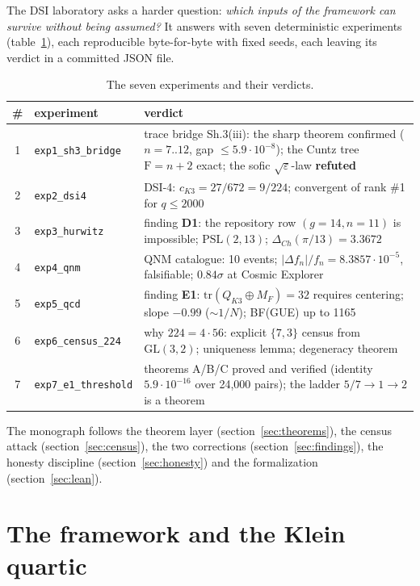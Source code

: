 \documentclass[11pt,a4paper]{article}
\theoremstyle{definition}
\newcommand{\F}{\mathrm{F}}
\begin{document}
The DSI laboratory asks a harder question: \emph{which inputs of the
framework can survive without being assumed?} It answers with seven
deterministic experiments (table~\ref{tab:experiments}), each
reproducible byte-for-byte with fixed seeds, each leaving its verdict
in a committed JSON file.

\begin{table}[ht]
\centering\small
\begin{tabular}{@{}clp{7.2cm}@{}}
\toprule
\# & experiment & verdict \\
\midrule
1 & \texttt{exp1\_sh3\_bridge} & trace bridge Sh.3(iii): the sharp theorem confirmed ($n=7..12$, gap $\le 5.9\cdot10^{-8}$); the Cuntz tree $\F = n+2$ exact; the sofic $\sqrt{\varepsilon}$-law \textbf{refuted} \\
2 & \texttt{exp2\_dsi4} & DSI-4: $c_{K3} = 27/672 = 9/224$; convergent of rank \#1 for $q \le 2000$ \\
3 & \texttt{exp3\_hurwitz} & finding \textbf{D1}: the repository row $(g{=}14, n{=}11)$ is impossible; $\mathrm{PSL}(2,13)$; $\Delta_{Ch}(\pi/13) = 3.3672$ \\
4 & \texttt{exp4\_qnm} & QNM catalogue: 10 events; $|\Delta f_n|/f_n = 8.3857\cdot 10^{-5}$, falsifiable; $0.84\sigma$ at Cosmic Explorer \\
5 & \texttt{exp5\_qcd} & finding \textbf{E1}: $\mathrm{tr}(Q_{K3}\oplus M_F) = 32$ requires centering; slope $-0.99$ ($\sim 1/N$); BF(GUE) up to 1165 \\
6 & \texttt{exp6\_census\_224} & why $224 = 4\cdot 56$: explicit $\{7,3\}$ census from $\mathrm{GL}(3,2)$; uniqueness lemma; degeneracy theorem \\
7 & \texttt{exp7\_e1\_threshold} & theorems A/B/C proved and verified (identity $5.9\cdot 10^{-16}$ over 24{,}000 pairs); the ladder $5/7 \to 1 \to 2$ is a theorem \\
\bottomrule
\end{tabular}
\caption{The seven experiments and their verdicts.}
\label{tab:experiments}
\end{table}

The monograph follows the theorem layer (section~\ref{sec:theorems}),
the census attack (section~\ref{sec:census}), the two corrections
(section~\ref{sec:findings}), the honesty discipline
(section~\ref{sec:honesty}) and the formalization
(section~\ref{sec:lean}).

\section{The framework and the Klein quartic}\label{sec:framework}
\end{document}
